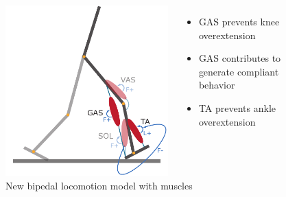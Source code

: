 \documentclass[10pt]{beamer}
\begin{document}
\begin{frame}
\begin{figure}
\begin{overprint}
		\begin{columns}
			\begin{column}{.5\textwidth}
				\includegraphics[height=.5\textheight]{images/new_model/stance/muscle_vas_sol_gas_ta.pdf} 
				\caption{New bipedal locomotion model with muscles}
			\end{column}
			\begin{column}{.5\textwidth}
				\begin{itemize}
					\item GAS prevents knee overextension  \\[1em]
					\item GAS contributes to generate compliant behavior \\[1em]
					\item TA prevents ankle overextension
				\end{itemize}
			\end{column}
		\end{columns}
	

\end{overprint}
\end{figure}
\end{frame}
\end{document}
